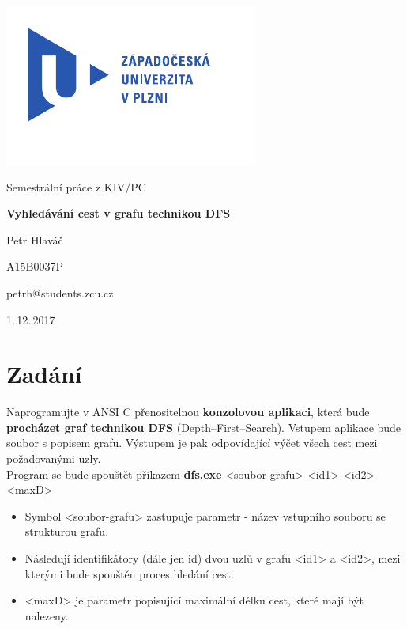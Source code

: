 \begin{titlepage}
	\vspace*{-2cm}
	{\centering\includegraphics[scale=1.0]{logo.pdf}\par}
	\centering
	\vspace*{2cm}
	{\Large Semestrální práce z KIV/PC\par}
	\vspace{1.5cm}
	{\Huge\bfseries Vyhledávání cest v grafu technikou DFS\par}
	\vspace{2cm}

	{\Large Petr Hlaváč\par}
	{\Large A15B0037P\par}
	{\Large petrh@students.zcu.cz\par}

	\vfill

	{\Large 1.\,12.\,2017}
\end{titlepage}

\tableofcontents
\thispagestyle{empty}
\clearpage

\chapter{Zadání}
Naprogramujte v ANSI C přenositelnou \textbf{konzolovou aplikaci}, která bude \textbf{procházet graf technikou DFS} (Depth--First--Search). Vstupem aplikace bude soubor s popisem grafu. Výstupem je pak odpovídající výčet všech cest mezi požadovanými uzly.\\

Program se bude spouštět příkazem \textbf{dfs.exe} <soubor-grafu> <id1> <id2> <maxD>
\begin{itemize}
\item Symbol <soubor-grafu> zastupuje parametr - název vstupního souboru se strukturou grafu.
\item Následují identifikátory (dále jen id) dvou uzlů v grafu <id1> a <id2>, mezi kterými bude spouštěn proces hledání cest.
\item <maxD> je parametr popisující maximální délku cest, které mají být nalezeny.
\end{itemize}

